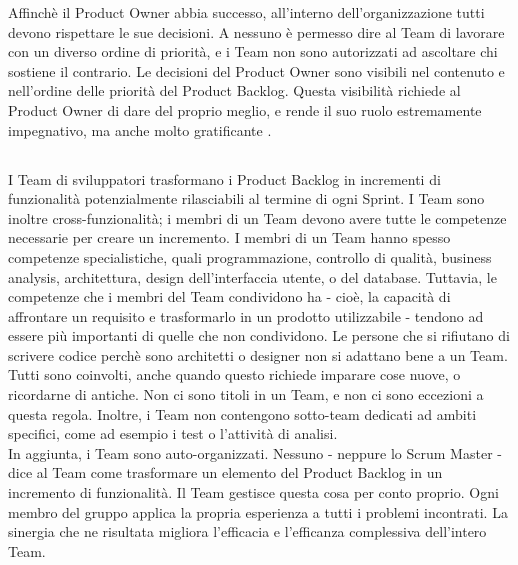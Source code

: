 \vspace{0.4cm}
\vspace{0.4cm}
\linebreak
Affinch\`e il Product Owner abbia successo, all'interno dell'organizzazione tutti devono rispettare le sue decisioni. A nessuno \`e  permesso dire al Team di lavorare con un diverso ordine di priorit\`a, e i Team non sono autorizzati ad ascoltare chi sostiene il contrario. Le decisioni del Product Owner sono visibili nel contenuto e nell'ordine  delle priorit\`a del Product Backlog. Questa visibilit\`a richiede al Product Owner di dare del proprio meglio, e rende il suo ruolo estremamente impegnativo, ma anche molto gratificante .\\

\subsection*{\color{Blue}{IL TEAM}}
\label{sec:team}
I Team di sviluppatori trasformano i Product Backlog in incrementi di funzionalit\`a potenzialmente rilasciabili al termine di ogni Sprint. I Team sono inoltre cross-funzionalit\`a; i membri di un Team devono avere tutte le competenze necessarie per creare un incremento. I membri di un Team hanno spesso competenze specialistiche, quali programmazione, controllo di qualit\`a, business analysis, architettura, design dell'interfaccia utente, o del database. Tuttavia, le competenze che i membri del Team condividono ha - cio\`e, la capacit\`a di affrontare un requisito e trasformarlo in un prodotto utilizzabile - tendono ad essere pi\`u importanti di quelle che non condividono. Le persone che si rifiutano di scrivere codice perch\`e sono architetti o designer non si adattano bene a un Team. Tutti sono coinvolti, anche quando questo richiede imparare cose nuove, o ricordarne di antiche. Non ci sono titoli in un Team, e non ci sono eccezioni a questa regola. Inoltre, i Team non contengono sotto-team dedicati ad ambiti specifici, come ad esempio i test o l'attivit\`a di analisi.\\
\linebreak
In aggiunta, i Team sono auto-organizzati. Nessuno - neppure lo Scrum Master - dice al Team come trasformare un  elemento del Product Backlog in un incremento di funzionalit\`a. Il Team  gestisce questa cosa per conto proprio. Ogni membro del gruppo applica la propria esperienza a tutti i problemi incontrati. La sinergia che ne risultata migliora l'efficacia e l'efficanza complessiva dell'intero Team.\\
              


